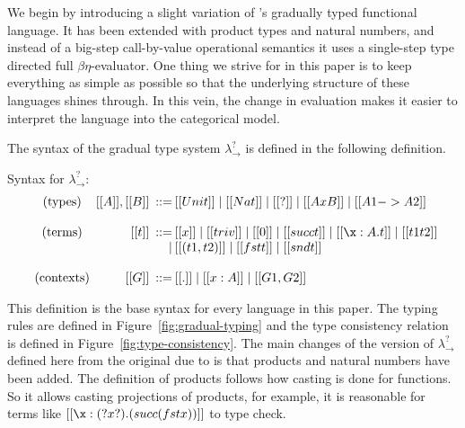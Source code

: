 We begin by introducing a slight variation of \cite{Siek:2006}'s
gradually typed functional language.  It has been extended with
product types and natural numbers, and instead of a big-step
call-by-value operational semantics it uses a single-step type
directed full $\beta\eta$-evaluator.  One thing we strive for in this
paper is to keep everything as simple as possible so that the
underlying structure of these languages shines through. In this vein,
the change in evaluation makes it easier to interpret the language
into the categorical model.

The syntax of the gradual type system $\lambda^?_\to$ is defined in
the following definition.
\begin{definition}
  \label{def:gradual-syntax}
  Syntax for $\lambda^?_\to$:
    \[
\begin{array}{c@{\hspace{5pt}}r@{}@{\hspace{5pt}}r@{}@{\hspace{2pt}}l@{}llllllllllll}
  \text{(types)} & [[A]],[[B]] & ::=  & [[Unit]] \mid [[Nat]] \mid [[?]] \mid [[A x B]] \mid [[A1 -> A2]]\\
  \\
  \text{(terms)} & [[t]] & ::=  & [[x]] \mid [[triv]] \mid [[0]]       \mid [[succ t]] \mid [[\x:A.t]]  \mid [[t1 t2]]\\
  &                      & \mid & [[(t1,t2)]] \mid [[fst t]] \mid [[snd t]] \\
  \\
  \text{(contexts)} & [[G]] & ::= & [[.]] \mid [[x : A]] \mid [[G1,G2]]\\
\end{array}
\]
\end{definition}
\noindent
This definition is the base syntax for every language in this paper.
The typing rules are defined in Figure~\ref{fig:gradual-typing} and
the type consistency relation is defined in
Figure~\ref{fig:type-consistency}.  The main changes of the version of
$\lambda^?_\to$ defined here from the original due to \cite{Siek:2006}
is that products and natural numbers have been added.  The definition
of products follows how casting is done for functions. So it allows
casting projections of products, for example, it is reasonable for
terms like $[[\x:(? x ?).(succ (fst x))]]$ to type check.
\renewcommand{\GradydrulevarName}[0]{\text{var}}
\renewcommand{\GradydruleunitName}[0]{\text{unit}}
\renewcommand{\GradydrulezeroName}[0]{\text{zero}}
\renewcommand{\GradydrulesuccName}[0]{\text{succ}}
\renewcommand{\GradydrulepairName}[0]{\times}
